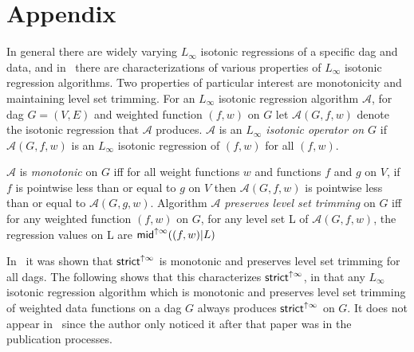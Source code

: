 \documentclass[11pt]{article}
\newcommand{\wmeanup}[2]{\ensuremath{\mathsf{mid}^{\uparrow #1}\ifthenelse{\equal{#2}{}}{}{(#2)}}}
\newcommand{\Strictup}[2]{\ensuremath{\mathsf{strict}^{\uparrow {#1}}\ifthenelse{\equal{#2}{}}{}{(#2)}}}
\begin{document}
\section*{Appendix}


In general there are widely varying $L_\infty$ isotonic regressions of a specific dag and data, and in~\cite{QStrictLinfty} there are characterizations of various properties of $L_\infty$ isotonic regression algorithms.
Two properties of particular interest are monotonicity and maintaining level set trimming.
For an $L_\infty$ isotonic regression algorithm $\mathcal{A}$, for dag $G=(V,E)$ and weighted function $(f,w)$ on $G$
let $\mathcal{A}(G,f,w)$ denote the isotonic regression that $\mathcal{A}$ produces.
$\mathcal{A}$ is an \textit{$L_\infty$ isotonic operator on $G$} if $\mathcal{A}(G,f,w)$ is an $L_\infty$ isotonic regression of $(f,w)$ for all $(f,w)$.

$\mathcal{A}$ is \textit{monotonic} on $G$ iff for all weight functions $w$ and functions $f$ and $g$ on $V$, if $f$ is pointwise less than or equal to $g$ on $V$ then $\mathcal{A}(G,f,w)$ is pointwise less than or equal to $\mathcal{A}(G,g,w)$.
Algorithm $\mathcal{A}$ \textit{preserves level set trimming} on $G$ iff for any weighted function $(f,w)$ on $G$, for any level set \textsf{L} of $\mathcal{A}(G,f,w)$, the regression values on \textsf{L} are \wmeanup{\infty}{(f,w)|L}

In~\cite{QStrictLinfty} it was shown that \Strictup{\infty}{} is monotonic and preserves level set trimming for all dags.
The following shows that this characterizes \Strictup{\infty}{}, in that any $L_\infty$ isotonic regression algorithm which is monotonic and preserves level set trimming of weighted data functions on a dag $G$ always produces \Strictup{\infty}{} on $G$.
It does not appear in~\cite{QStrictLinfty} since the author only noticed it
after that paper was in the publication processes.
\end{document}
